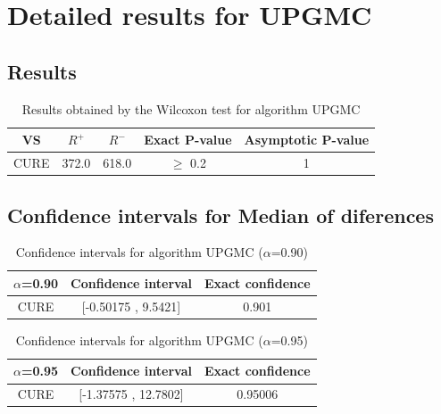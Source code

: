 \documentclass[a4paper,10pt]{article}
\begin{document}
 \clearpage 


\section{Detailed results for UPGMC}


\subsection{Results}

\begin{table}[!htp]
\centering\small
\begin{tabular}{
|c|c|c|c|c|}
\hline
 VS & $R^{+}$ & $R^{-}$ & Exact P-value & Asymptotic P-value \\ \hline 
CURE & 372.0 & 618.0 & $\geq$ 0.2 & 1\\ \hline 

\end{tabular}
\caption{Results obtained by the Wilcoxon test for algorithm UPGMC}
\end{table}

\subsection{Confidence intervals for Median of diferences}

\begin{table}[!htp]
\centering\small
\begin{tabular}{
|c|c|c|}
\hline
 $\alpha$=0.90 & Confidence interval & Exact confidence \\ \hline 
CURE & [-0.50175 , 9.5421] & 0.901\\ \hline 

\end{tabular}
\caption{Confidence intervals for algorithm UPGMC ($\alpha$=0.90)}
\end{table}
\begin{table}[!htp]
\centering\small
\begin{tabular}{
|c|c|c|}
\hline
 $\alpha$=0.95 & Confidence interval & Exact confidence \\ \hline 
CURE & [-1.37575 , 12.7802] & 0.95006\\ \hline 

\end{tabular}
\caption{Confidence intervals for algorithm UPGMC ($\alpha$=0.95)}
\end{table}

 \clearpage 
\end{document}
